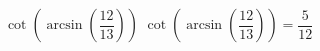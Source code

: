  {$\cot\left(\arcsin\left(\dfrac{12}{13}\right)\right)$ }
{ $\cot\left(\arcsin\left(\dfrac{12}{13}\right)\right) = \dfrac{5}{12}$}
